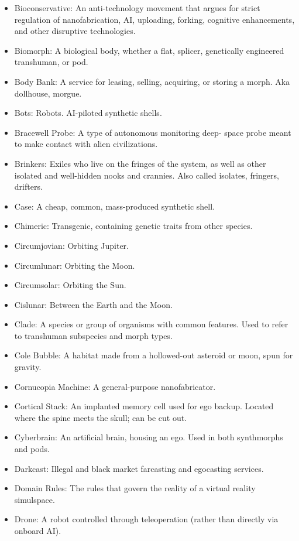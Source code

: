 \begin{itemize}
\item Bioconservative: An anti-technology movement that argues for
  strict regulation of nanofabrication, AI, uploading, forking,
  cognitive enhancements, and other disruptive technologies.
\item Biomorph: A biological body, whether a flat, splicer,
  genetically engineered transhuman, or pod.
\item Body Bank: A service for leasing, selling, acquiring, or storing
  a morph. Aka dollhouse, morgue.
\item Bots: Robots. AI-piloted synthetic shells.
\item Bracewell Probe: A type of autonomous monitoring deep- space
  probe meant to make contact with alien civilizations.
\item Brinkers: Exiles who live on the fringes of the system, as well
  as other isolated and well-hidden nooks and crannies. Also called
  isolates, fringers, drifters.
\item Case: A cheap, common, mass-produced synthetic shell.
\item Chimeric: Transgenic, containing genetic traits from other
  species.
\item Circumjovian: Orbiting Jupiter.
\item Circumlunar: Orbiting the Moon.
\item Circumsolar: Orbiting the Sun.
\item Cislunar: Between the Earth and the Moon.
\item Clade: A species or group of organisms with common
  features. Used to refer to transhuman subspecies and morph types.
\item Cole Bubble: A habitat made from a hollowed-out asteroid or
  moon, spun for gravity.
\item Cornucopia Machine: A general-purpose nanofabricator.
\item Cortical Stack: An implanted memory cell used for ego
  backup. Located where the spine meets the skull; can be cut out.
\item Cyberbrain: An artificial brain, housing an ego. Used in both
  synthmorphs and pods.
\item Darkcast: Illegal and black market farcasting and egocasting
  services.
\item Domain Rules: The rules that govern the reality of a virtual
  reality simulspace.
\item Drone: A robot controlled through teleoperation (rather than
  directly via onboard AI).

\end{itemize}
